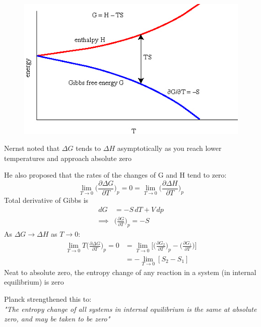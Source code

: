 \documentclass[a4paper, 11pt, normalem]{report}
\newcommand\p{\partial}
\begin{document}
\begin{figure}
    \begin{center}
        \includegraphics[scale=0.4]{G-H.png}
        \vspace{-30pt}
    \end{center}
\end{figure}

Nernst noted that $\Delta G$ tends to $\Delta H$ asymptotically as you reach lower temperatures and approach absolute zero

He also proposed that the rates of the changes of G and H tend to zero:
\begin{equation*}
    \lim_{T \to 0} \Big(\frac{\p \Delta G}{\p T}\Big)_p = 0 = \lim_{T \to 0} \Big(\frac{\p \Delta H}{\p T}\Big)_p
\end{equation*}
Total derivative of Gibbs is
\begin{align*}
    dG &= -S\,dT + V\,dp \\
    \implies & \Big(\frac{\p G}{\p T}\Big)_p = -S
\end{align*}
As $\Delta G \to \Delta H$ as $T \to 0$:
\begin{align*}
    \lim_{T \to 0} T\Big(\frac{\p \Delta G}{\p T}\Big)_p = 0 &= \lim_{T \to 0} \Bigg[\Big(\frac{\p G_2}{\p T}\Big)_p - \Big(\frac{\p G_1}{\p T}\Big)\Bigg] \\
    &= -\lim_{T \to 0}[S_2 - S_1]
\end{align*}
Neat to absolute zero, the entropy change of any reaction in a system (in internal equilibrium) is zero

Planck strengthened this to: \\
\emph{"The entropy change of all systems in internal equilibrium is the same at absolute zero, and may be taken to be zero"}
\end{document}
